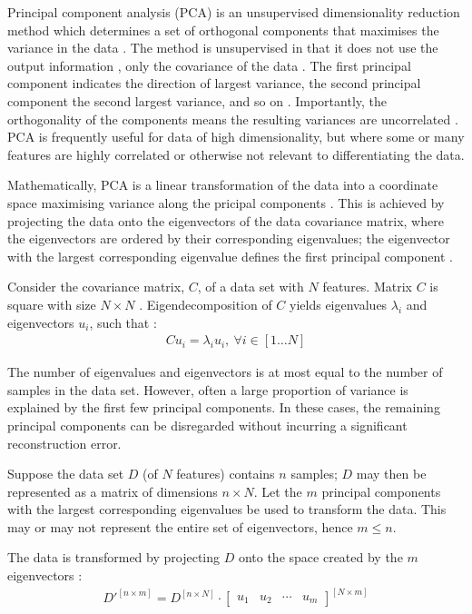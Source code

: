 Principal component analysis (PCA) is an unsupervised dimensionality reduction method which determines a set of orthogonal components that maximises the variance in the data \cite{alpaydin_2020} \cite{lovell_2008}. The method is unsupervised in that it does not use the output information \cite{alpaydin_2020}, only the covariance of the data \cite{lovell_2008}. The first principal component indicates the direction of largest variance, the second principal component the second largest variance, and so on \cite{alpaydin_2020}. Importantly, the orthogonality of the components means the resulting variances are uncorrelated \cite{alpaydin_2020}. PCA is frequently useful for data of high dimensionality, but where some or many features are highly correlated or otherwise not relevant to differentiating the data.

Mathematically, PCA is a linear transformation of the data into a coordinate space maximising variance along the pricipal components \cite{jolliffe_2002}. This is achieved by projecting the data onto the eigenvectors of the data covariance matrix, where the eigenvectors are ordered by their corresponding eigenvalues; the eigenvector with the largest corresponding eigenvalue defines the first principal component \cite{rosebrock_2021}.

Consider the covariance matrix, $C$, of a data set with $N$ features. Matrix $C$ is square with size $N\times N$ \cite{lovell_2008}. Eigendecomposition of $C$ yields eigenvalues $\lambda_i$ and eigenvectors $u_i$, such that \cite{lovell_2008}:
\begin{align}
  C u_i = \lambda_i u_i,\ \forall i \in [1 \ldots N]
\end{align}

The number of eigenvalues and eigenvectors is at most equal to the number of samples in the data set. However, often a large proportion of variance is explained by the first few principal components. In these cases, the remaining principal components can be disregarded without incurring a significant reconstruction error.

Suppose the data set $D$ (of $N$ features) contains $n$ samples; $D$ may then be represented as a matrix of dimensions $n\times N$. Let the $m$ principal components with the largest corresponding eigenvalues be used to transform the data. This may or may not represent the entire set of eigenvectors, hence $m\leq n$.

The data is transformed by projecting $D$ onto the space created by the $m$ eigenvectors \cite{rosebrock_2021}:
\begin{align}
  D'^{[n\times m]} = D^{[n\times N]} \cdot \begin{bmatrix} u_1 & u_2 & \cdots & u_m \end{bmatrix}^{[N\times m]}
\end{align}

